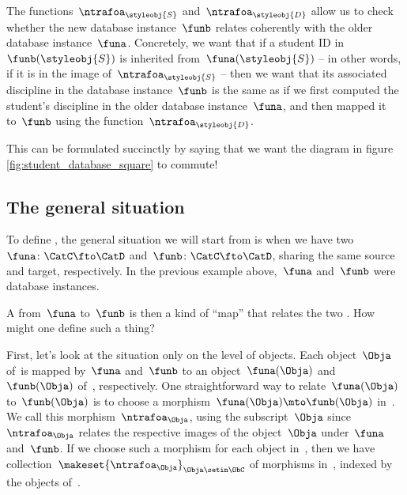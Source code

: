 The functions~$\ntrafoa_\styleobj{S}$ and~$\ntrafoa_\styleobj{D}$ allow us to check whether the new database instance~$\funb$ relates coherently with the older database instance~$\funa$.
Concretely, we want that if a student ID in~$\funb(\styleobj{S})$ is inherited from~$\funa(\styleobj{S})$ -- in other words, if it is in the image of~$\ntrafoa_{\styleobj{S}}$ --  then we want that its associated discipline in the database instance~$\funb$ is the same as if we first computed the student's discipline in the older database instance~$\funa$, and then mapped it to~$\funb$ using the function~$\ntrafoa_{\styleobj{D}}$.

%
\begin{marginfigure}
    \centering
    \caption{}
    \label{fig:student_database_square}
\end{marginfigure}
%

This can be formulated succinctly by saying that we want the diagram in figure \cref{fig:student_database_square} to commute!

\subsection{The general situation}

To define , the general situation we will start from is when we have two ~$\funa \colon \CatC \fto \CatD$  and~$\funb \colon \CatC \fto \CatD$, sharing the same source and target, respectively.
In the previous example above,~$\funa$ and~$\funb$ were database instances.

A  from~$\funa$ to~$\funb$ is then a kind of ``map'' that relates the two .
How might one define such a thing?

First, let's look at the situation only on the level of objects.
Each object~$\Obja$ of~\CatC is mapped by~$\funa$ and~$\funb$ to an object~$\funa(\Obja)$ and~$\funb(\Obja)$ of~\CatD, respectively.
One straightforward way to relate~$\funa(\Obja)$ to~$\funb(\Obja)$ is to choose a morphism~$\funa(\Obja) \mto \funb(\Obja)$ in~\CatD.
We call this morphism~$\ntrafoa_{\Obja}$, using the subscript~$\Obja$ since~$\ntrafoa_{\Obja}$ relates the respective images of the object~$\Obja$ under~$\funa$ and~$\funb$.
If we choose such a morphism for each object in~\CatC, then we have collection~$\makeset{ \ntrafoa_\Obja }_{\Obja \setin \ObC}$ of morphisms in~\CatD, indexed by the objects of~\CatC.

